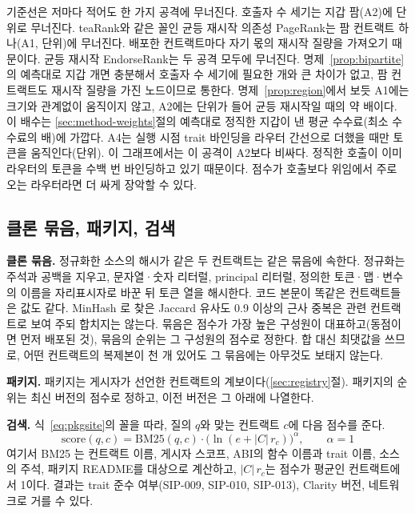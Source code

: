 기준선은 저마다 적어도 한 가지 공격에 무너진다. 호출자 수 세기는 지갑 팜(A2)에 \ToyCostCallersATwo 단위로 무너진다. teaRank와 같은 꼴인 균등 재시작 의존성 PageRank는 팜 컨트랙트 하나(A1, \ToyCostDepPRAOne 단위)에 무너진다. 배포한 컨트랙트마다 자기 몫의 재시작 질량을 가져오기 때문이다. 균등 재시작 EndorseRank는 두 공격 모두에 무너진다. 명제~\ref{prop:bipartite}의 예측대로 지갑 \ToyCostERUniformATwo 개면 충분해서 호출자 수 세기에 필요한 \ToyCostCallersATwo 개와 큰 차이가 없고, 팜 컨트랙트도 재시작 질량을 가진 노드이므로 통한다.  명제~\ref{prop:region}에서 보듯 A1에는 크기와 관계없이 움직이지 않고, A2에는 \ToyCostPCERATwo 단위가 들어 균등 재시작일 때의 약 \ToyRatioATwo 배이다. 이 배수는 \ref{sec:method-weights}절의 예측대로 정직한 지갑이 낸 평균 수수료(최소 수수료의 \ToyMeanFee 배)에 가깝다. A4는 실행 시점 trait 바인딩을 라우터 간선으로 더했을 때만 토큰을 움직인다(\ToyCostPCERBindAFour 단위). 이 그래프에서는 이 공격이 A2보다 비싸다. 정직한 호출이 이미 라우터의 토큰을 수백 번 바인딩하고 있기 때문이다. 점수가 호출보다 위임에서 주로 오는 라우터라면 더 싸게 장악할 수 있다.

\subsection{클론 묶음, 패키지, 검색}
\label{sec:method-search}

\textbf{클론 묶음.} 정규화한 소스의 해시가 같은 두 컨트랙트는 같은 묶음에 속한다. 정규화는 주석과 공백을 지우고, 문자열·숫자 리터럴, principal 리터럴, 정의한 토큰·맵·변수의 이름을 자리표시자로 바꾼 뒤 토큰 열을 해시한다. 코드 본문이 똑같은 컨트랙트들은  값도 같다. MinHash \cite{broder1997resemblance}로 찾은 Jaccard 유사도 0.9 이상의 근사 중복은 관련 컨트랙트로 보여 주되 합치지는 않는다. 묶음은 점수가 가장 높은 구성원이 대표하고(동점이면 먼저 배포된 것), 묶음의 순위는 그 구성원의 점수로 정한다. 합 대신 최댓값을 쓰므로, 어떤 컨트랙트의 복제본이 천 개 있어도 그 묶음에는 아무것도 보태지 않는다.

\textbf{패키지.} 패키지는 게시자가 선언한 컨트랙트의 계보이다(\ref{sec:registry}절). 패키지의 순위는 최신 버전의 점수로 정하고, 이전 버전은 그 아래에 나열한다.

\textbf{검색.} 식~\eqref{eq:pkgsite}의 꼴을 따라, 질의 $q$와 맞는 컨트랙트 $c$에 다음 점수를 준다.
\begin{equation}
\label{eq:search}
\mathrm{score}(q,c)=\mathrm{BM25}(q,c)\cdot\bigl(\ln(e+|C|\,r_c)\bigr)^{\alpha},\qquad \alpha=1
\end{equation}
여기서 BM25 \cite{robertson2009bm25}는 컨트랙트 이름, 게시자 스코프, ABI의 함수 이름과 trait 이름, 소스의 주석, 패키지 README를 대상으로 계산하고, $|C|\,r_c$는 점수가 평균인 컨트랙트에서 1이다. 결과는 trait 준수 여부(SIP-009, SIP-010, SIP-013), Clarity 버전, 네트워크로 거를 수 있다.
